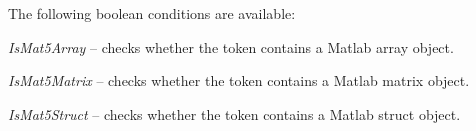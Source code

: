 \documentclass[a4paper]{book}
\begin{document}
The following boolean conditions are available:
\begin{tight_itemize}
  \item \textit{IsMat5Array} -- checks whether the token contains a Matlab array object.
  \item \textit{IsMat5Matrix} -- checks whether the token contains a Matlab matrix object.
  \item \textit{IsMat5Struct} -- checks whether the token contains a Matlab struct object.
\end{tight_itemize}



\end{document}

